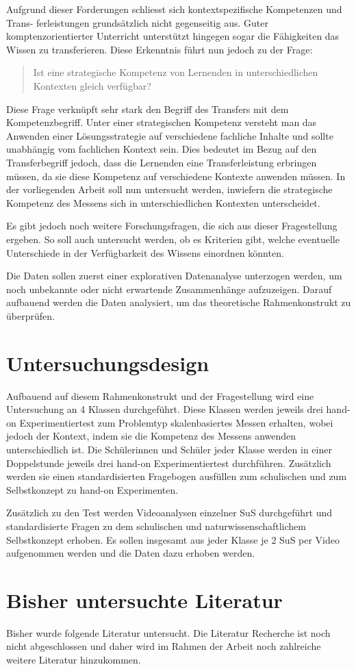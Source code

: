 \documentclass[paper=a4, fontsize=12pt, parskip=half]{scrartcl} %
\begin{document}
Aufgrund dieser Forderungen schliesst sich kontextspezifische Kompetenzen und Trans-
ferleistungen grundsätzlich nicht gegenseitig aus. Guter komptenzorientierter Unterricht
unterstützt hingegen sogar die Fähigkeiten das Wissen zu transferieren. Diese Erkenntnis
führt nun jedoch zu der Frage:


\begin{quote}
Ist eine strategische Kompetenz von Lernenden in unterschiedlichen Kontexten
gleich verfügbar?
\end{quote}
Diese Frage verknüpft sehr stark den Begriff des Transfers mit dem Kompetenzbegriff.
Unter einer strategischen Kompetenz versteht man das Anwenden einer Lösungsstrategie
auf verschiedene fachliche Inhalte und sollte unabhängig vom fachlichen Kontext sein. Dies
bedeutet im Bezug auf den Transferbegriff jedoch, dass die Lernenden eine Transferleistung
erbringen müssen, da sie diese Kompetenz auf verschiedene Kontexte anwenden müssen.
In der vorliegenden Arbeit soll nun untersucht werden, inwiefern die strategische Kompetenz des Messens sich in unterschiedlichen Kontexten unterscheidet.


Es gibt jedoch noch weitere Forschungsfragen, die sich aus dieser Fragestellung ergeben. So soll auch untersucht werden, ob es Kriterien gibt, welche eventuelle Unterschiede in der Verfügbarkeit des Wissens einordnen könnten.

Die Daten sollen zuerst einer explorativen Datenanalyse unterzogen werden, um noch unbekannte oder nicht erwartende Zusammenhänge aufzuzeigen. Darauf aufbauend werden die Daten analysiert, um das theoretische Rahmenkonstrukt zu überprüfen.

\section{Untersuchungsdesign}

Aufbauend auf diesem Rahmenkonstrukt und der Fragestellung wird eine Untersuchung an 4 Klassen durchgeführt. Diese Klassen werden jeweils drei hand-on Experimentiertest zum Problemtyp skalenbasiertes Messen \citep{Metzger2013} erhalten, wobei jedoch der Kontext, indem sie die Kompetenz des Messens anwenden unterschiedlich ist. Die Schülerinnen und Schüler jeder Klasse werden in einer Doppelstunde jeweils drei hand-on Experimentiertest durchführen. Zusätzlich werden sie einen standardisierten Fragebogen ausfüllen zum schulischen und zum Selbstkonzept zu hand-on Experimenten. 

Zusätzlich zu den Test werden Videoanalysen einzelner SuS durchgeführt und standardisierte Fragen zu dem schulischen und naturwissenschaftlichem Selbstkonzept erhoben. Es sollen insgesamt aus jeder Klasse je 2 SuS per Video aufgenommen werden und die Daten dazu erhoben werden.

\section{Bisher untersuchte Literatur}

Bisher wurde folgende Literatur untersucht. Die Literatur Recherche ist noch nicht abgeschlossen und daher wird im Rahmen der Arbeit noch zahlreiche weitere Literatur hinzukommen.



\printbibliography[heading=none]
\end{document}
